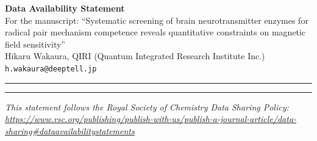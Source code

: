 \documentclass[11pt,a4paper]{article}
\begin{document}
\begin{center}
{\Large\bfseries Data Availability Statement}\\[0.5em]
{\small For the manuscript: ``Systematic screening of brain neurotransmitter enzymes
for radical pair mechanism competence reveals quantitative constraints on
magnetic field sensitivity''}\\[0.3em]
{\small Hikaru Wakaura, QIRI (Quantum Integrated Research Institute Inc.)}\\[0.3em]
{\small \texttt{h.wakaura@deeptell.jp}}
\end{center}

\vspace{1em}
\hrule
\vspace{1em}

\renewcommand{\cite}[1]{[ref]}



\vspace{2em}
\hrule
\vspace{1em}

\noindent\textit{This statement follows the Royal Society of Chemistry Data Sharing Policy:
\url{https://www.rsc.org/publishing/publish-with-us/publish-a-journal-article/data-sharing\#dataavailabilitystatements}}
\end{document}
